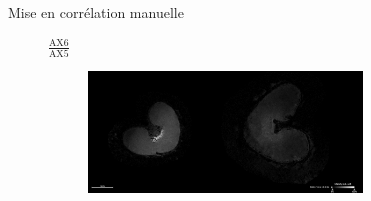\documentclass[10pt]{beamer}
\begin{document}
\begin{frame}{Mise en corrélation manuelle}
\begin{figure}
    $\frac{\text{AX6}}{\text{AX5}}$  
    \begin{subfigure}[c]{0.66\textwidth}
      \centering
      \includegraphics[width=0.8\textwidth]{fig/manualcorr_msi_250650}
      \caption{}
      \label{subfig:manualcorr_msi_250650}
    \end{subfigure}%
  \end{figure}
  

\end{frame}
\end{document}
